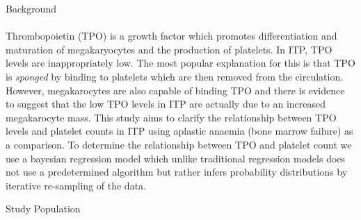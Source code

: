 \documentclass[landscape,a0paper,fontscale=0.285]{beamer} %
\newlength{\onecolwid}
\begin{document}
\begin{frame}[t]
\begin{columns}[t]
\begin{column}{\onecolwid}
\begin{alertblock}{Background}
\paragraph{} Thrombopoietin (TPO) is a growth factor which promotes differentiation and maturation of megakaryocytes and the production of platelets.
In ITP, TPO levels are inappropriately low. The most popular explanation for this is that TPO is \emph{sponged} by binding to platelets which are then removed from the circulation\cite{Kuterreciprocalrelationshipthrombopoietin1995}. However, megakarocytes are also capable of binding TPO and there is evidence to suggest that the low TPO levels in ITP are actually due to an increased megakarocyte mass\cite{SatoBindingregulationthrombopoietin1998}. This study aims to clarify the relationship between TPO levels and platelet counts in ITP using aplastic anaemia (bone marrow failure) as a comparison. To determine the relationship between TPO and platelet count we use a bayesian regression model which unlike traditional regression models does not use a predetermined algorithm but rather infers probability distributions by iterative re-sampling of the data\cite{ChaturvediRobustBayesiananalysis1996}. 








\end{alertblock}

\begin{block}{Study Population}


\end{block}
\end{column}
\end{columns}
\end{frame}
\end{document}

